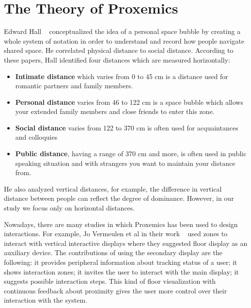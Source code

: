 \section{The Theory of Proxemics}
\label{sec:The Theory of Proxemics}
Edward Hall ~\cite{hall1963system,hall1910hidden} conceptualized the idea of a
personal space bubble by creating a whole system of notation in order to understand
and record how people navigate shared space.
He correlated physical distance to social distance.
According to these papers, Hall identified four distances which are measured horizontally:
\begin{itemize}
  \item \textbf{Intimate distance} which varies from 0 to 45 cm is a distance used for romantic partners and family members.
  \item \textbf{Personal distance} varies from 46 to 122 cm is a space bubble which allows your extended family
        members and close friends to enter this zone.
  \item \textbf{Social distance} varies from 122 to 370 cm is often used for acquaintances and colloquies
  \item \textbf{Public distance}, having a range of 370 cm and more, is often used in public speaking
        situation and with strangers you want to maintain your distance from.
\end{itemize}

He also analyzed vertical distances, for example, the difference in vertical distance
between people can reflect the degree of dominance.
However, in our study we focus only on horizontal distances.

Nowadays, there are many studies in which Proxemics has been used to design interactions.
For example, Jo Vermeulen et al in their work ~\cite{vermeulen2015proxemic} used zones to
interact with vertical interactive displays where they suggested floor display as an auxiliary device.
The contributions of using the secondary display are the following: it provides peripheral
information about tracking status of a user;
it shows interaction zones;
it invites the user to interact with the main display;
it suggests possible interaction steps.
This kind of floor visualization with continuous feedback about proximity gives the user
more control over their interaction with the system.

